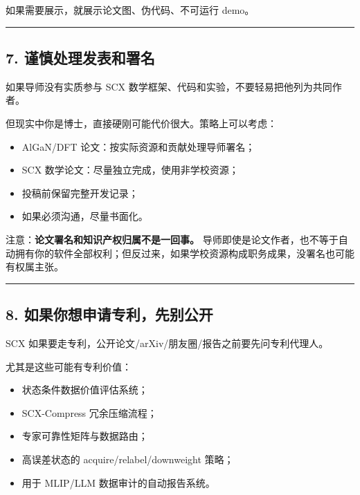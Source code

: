 \documentclass[
  12pt,
]{ctexart}
\providecommand{\tightlist}{%
  \setlength{\itemsep}{0pt}\setlength{\parskip}{0pt}}
\begin{document}
如果需要展示，就展示论文图、伪代码、不可运行 demo。

\begin{center}\rule{0.5\linewidth}{0.5pt}\end{center}

\subsection{7.
谨慎处理发表和署名}\label{ux8c28ux614eux5904ux7406ux53d1ux8868ux548cux7f72ux540d}

如果导师没有实质参与 SCX
数学框架、代码和实验，不要轻易把他列为共同作者。

但现实中你是博士，直接硬刚可能代价很大。策略上可以考虑：

\begin{itemize}
\tightlist
\item
  AlGaN/DFT 论文：按实际资源和贡献处理导师署名；
\item
  SCX 数学论文：尽量独立完成，使用非学校资源；
\item
  投稿前保留完整开发记录；
\item
  如果必须沟通，尽量书面化。
\end{itemize}

注意：\textbf{论文署名和知识产权归属不是一回事。}
导师即使是论文作者，也不等于自动拥有你的软件全部权利；但反过来，如果学校资源构成职务成果，没署名也可能有权属主张。

\begin{center}\rule{0.5\linewidth}{0.5pt}\end{center}

\subsection{8.
如果你想申请专利，先别公开}\label{ux5982ux679cux4f60ux60f3ux7533ux8bf7ux4e13ux5229ux5148ux522bux516cux5f00}

SCX 如果要走专利，公开论文/arXiv/朋友圈/报告之前要先问专利代理人。

尤其是这些可能有专利价值：

\begin{itemize}
\tightlist
\item
  状态条件数据价值评估系统；
\item
  SCX-Compress 冗余压缩流程；
\item
  专家可靠性矩阵与数据路由；
\item
  高误差状态的 acquire/relabel/downweight 策略；
\item
  用于 MLIP/LLM 数据审计的自动报告系统。
\end{itemize}
\end{document}
